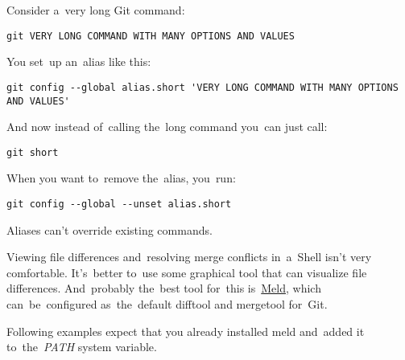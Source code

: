 \example
\noindent Consider a~very long Git command:
\begin{lstlisting}[frame=no]
    git VERY LONG COMMAND WITH MANY OPTIONS AND VALUES
\end{lstlisting}
\noindent You set~up an~alias like this:
\begin{lstlisting}[frame=no]
    git config --global alias.short 'VERY LONG COMMAND WITH MANY OPTIONS AND VALUES'
\end{lstlisting}
\noindent And now instead of~calling the~long command you~can just call:
\begin{lstlisting}[frame=no]
    git short
\end{lstlisting}
\noindent When you want to~remove the~alias, you~run:
\begin{lstlisting}[frame=no]
    git config --global --unset alias.short
\end{lstlisting}

\warning Aliases can't override existing commands.
\newpage

Viewing file differences and~resolving merge conflicts in~a~Shell isn't very comfortable. It's~better to~use some graphical tool that can visualize file differences. And~probably the~best tool for~this is~\href{https://meldmerge.org/}{Meld}, which can~be~configured as~the~default difftool and mergetool for~Git.

Following examples expect that you already installed meld and~added it to~the~\textit{PATH} system variable.

